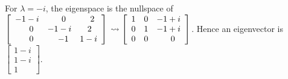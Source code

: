 \begin{enumerate}
\begin{description}
For $\lambda=-i$, the eigenspace  is the nullspace of $\left[
\begin {array}{rrr} -1-i&0~~&2~ \\ 0~~&-1-i&2~~ \\0~~&-1~&1-i \end
{array}\right] \\ \leadsto \left[ \begin {array}{rrr} 1&0&-1+i \\
0&1&-1+i \\ 0&0&0~~ \end {array} \right]$. Hence an eigenvector is
$\left[ \begin {array}{r} 1-i \\ 1-i \\1~~ \end {array}\right]$.\\


\end{description}
\end{enumerate}
